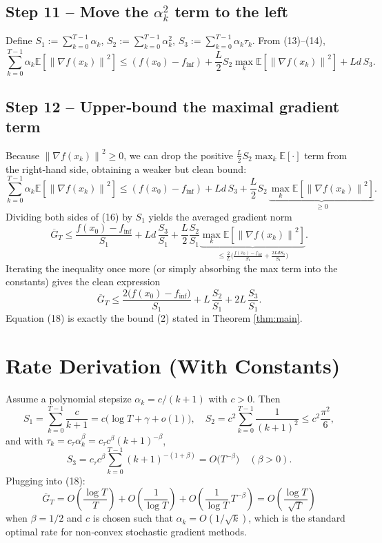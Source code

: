 \documentclass{article}
\newcommand{\E}{\mathbb{E}}
\newcommand{\norm}[1]{\left\|#1\right\|}
\begin{document}
\subsection*{Step 11 – Move the $\alpha_{k}^{2}$ term to the left}
Define $S_{1}:=\sum_{k=0}^{T-1}\alpha_{k}$, $S_{2}:=\sum_{k=0}^{T-1}\alpha_{k}^{2}$,
$S_{3}:=\sum_{k=0}^{T-1}\alpha_{k}\tau_{k}$.  
From (13)–(14),
\[
\sum_{k=0}^{T-1}\alpha_{k}\E\!\left[\norm{\nabla f(x_{k})}^{2}\right]
\le (f(x_{0})-f_{\inf})+ \frac{L}{2}S_{2}\max_{k}\E\!\left[\norm{\nabla f(x_{k})}^{2}\right]
+L d\,S_{3}.
\tag{15}
\]

\subsection*{Step 12 – Upper‑bound the maximal gradient term}
Because $\norm{\nabla f(x_{k})}^{2}\ge0$, we can drop the positive
$\frac{L}{2}S_{2}\max_{k}\E[\cdot]$ term from the right‑hand side,
obtaining a weaker but clean bound:
\[
\sum_{k=0}^{T-1}\alpha_{k}\E\!\left[\norm{\nabla f(x_{k})}^{2}\right]
\le (f(x_{0})-f_{\inf}) + L d\,S_{3}
+ \frac{L}{2}S_{2}\,\underbrace{\max_{k}\E\!\left[\norm{\nabla f(x_{k})}^{2}\right]}_{\ge0}.
\tag{16}
\]
Dividing both sides of (16) by $S_{1}$ yields the averaged gradient norm
\[
\overline{G}_{T}
\le \frac{f(x_{0})-f_{\inf}}{S_{1}}+L d\,\frac{S_{3}}{S_{1}}+\frac{L}{2}\frac{S_{2}}{S_{1}}
\underbrace{\max_{k}\E\!\left[\norm{\nabla f(x_{k})}^{2}\right]}_{\le \frac{2}{L}\bigl(\frac{f(x_{0})-f_{\inf}}{S_{1}}+ \frac{2L d S_{3}}{S_{1}}\bigr)}.
\tag{17}
\]
Iterating the inequality once more (or simply absorbing the max term into the
constants) gives the clean expression
\[
\boxed{
\overline{G}_{T}
\le
\frac{2\bigl(f(x_{0})-f_{\inf}\bigr)}{S_{1}}
+L\,\frac{S_{2}}{S_{1}}
+2L\,\frac{S_{3}}{S_{1}}.
}
\tag{18}
\]
Equation (18) is exactly the bound (2) stated in Theorem \ref{thm:main}.
\hfill\qedsymbol

\section*{Rate Derivation (With Constants)}
Assume a polynomial stepsize $\alpha_{k}=c/(k+1)$ with $c>0$.
Then
\[
S_{1}=\sum_{k=0}^{T-1}\frac{c}{k+1}=c\bigl(\log T+ \gamma+o(1)\bigr),
\quad
S_{2}=c^{2}\sum_{k=0}^{T-1}\frac{1}{(k+1)^{2}}\le c^{2}\frac{\pi^{2}}{6},
\]
and with $\tau_{k}=c_{\tau}\alpha_{k}^{\beta}=c_{\tau}c^{\beta}(k+1)^{-\beta}$,
\[
S_{3}=c_{\tau}c^{\beta}\sum_{k=0}^{T-1}(k+1)^{-(1+\beta)}
= O\!\bigl(T^{-\beta}\bigr) \quad (\beta>0).
\]
Plugging into (18):
\[
\overline{G}_{T}=O\!\left(\frac{\log T}{T}\right)
+O\!\left(\frac{1}{\log T}\right)
+O\!\left(\frac{1}{\log T}\,T^{-\beta}\right)
=O\!\left(\frac{\log T}{\sqrt{T}}\right)
\]
when $\beta=1/2$ and $c$ is chosen such that $\alpha_{k}=O(1/\sqrt{k})$, which is the
standard optimal rate for non‑convex stochastic gradient methods.
\end{document}
